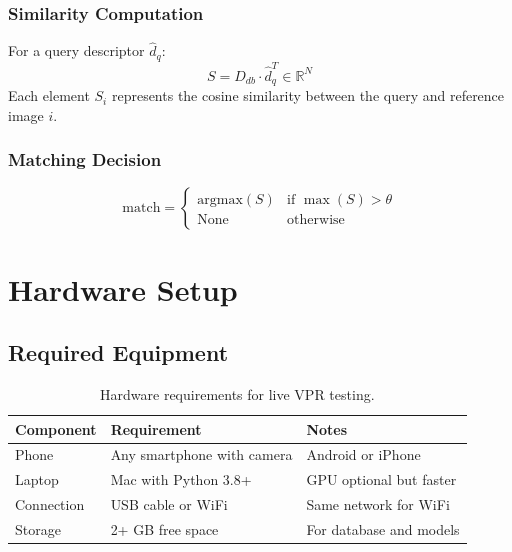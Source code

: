 \documentclass[11pt,a4paper]{article}
\begin{document}
\subsubsection{Similarity Computation}
For a query descriptor $\hat{d}_q$:
\begin{equation}
    S = D_{db} \cdot \hat{d}_q^T \in \mathbb{R}^N
\end{equation}
Each element $S_i$ represents the cosine similarity between the query and reference image $i$.

\subsubsection{Matching Decision}
\begin{equation}
    \text{match} = \begin{cases}
        \text{argmax}(S) & \text{if } \max(S) > \theta \\
        \text{None} & \text{otherwise}
    \end{cases}
\end{equation}

\newpage
\section{Hardware Setup}

\subsection{Required Equipment}

\begin{table}[H]
    \centering
    \begin{tabular}{lll}
        \toprule
        \textbf{Component} & \textbf{Requirement} & \textbf{Notes} \\
        \midrule
        Phone & Any smartphone with camera & Android or iPhone \\
        Laptop & Mac with Python 3.8+ & GPU optional but faster \\
        Connection & USB cable or WiFi & Same network for WiFi \\
        Storage & 2+ GB free space & For database and models \\
        \bottomrule
    \end{tabular}
    \caption{Hardware requirements for live VPR testing.}
\end{table}
\end{document}
